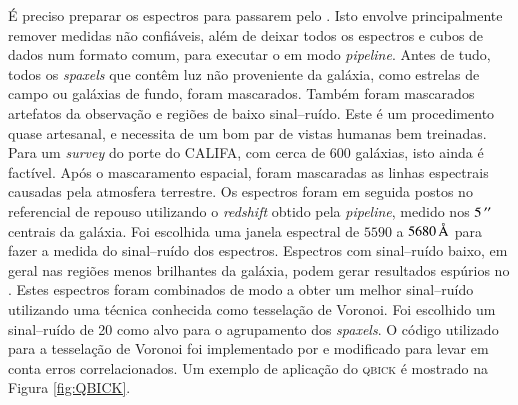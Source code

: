 É preciso preparar os espectros para passarem pelo \starlight. Isto envolve
principalmente remover medidas não confiáveis, além de deixar todos os espectros
e cubos de dados num formato comum, para executar o \starlight em modo {\em
pipeline}. Antes de tudo, todos os {\em spaxels} que contêm luz não proveniente
da galáxia, como estrelas de campo ou galáxias de fundo, foram mascarados.
Também foram mascarados artefatos da observação e regiões de baixo sinal--ruído.
Este é um procedimento quase artesanal, e necessita de um bom par de vistas
humanas bem treinadas. Para um {\em survey} do porte do CALIFA, com cerca de 600
galáxias, isto ainda é factível. Após o mascaramento espacial, foram mascaradas
as linhas espectrais causadas pela atmosfera terrestre. Os espectros foram em
seguida postos no referencial de repouso utilizando o {\em redshift} obtido pela
{\em pipeline}, medido nos $5\,^{\prime\prime}$ centrais da galáxia. Foi escolhida uma
janela espectral de $5590$ a $5680\,\text{\normalfont\AA}$ para fazer a medida do
sinal--ruído dos espectros. Espectros com sinal--ruído baixo, em geral nas
regiões menos brilhantes da galáxia, podem gerar resultados espúrios no
\starlight. Estes espectros foram combinados de modo a obter um melhor
sinal--ruído utilizando uma técnica conhecida como tesselação de Voronoi. Foi
escolhido um sinal--ruído de 20 como alvo para o agrupamento dos {\em spaxels}.
O código utilizado para a tesselação de Voronoi foi implementado por
\citet{Cappellari2003} e modificado para levar em conta erros correlacionados.
Um exemplo de aplicação do \textsc{qbick} é mostrado na Figura \ref{fig:QBICK}.


